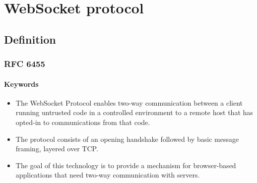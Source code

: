 \documentclass{beamer}
\begin{document}
\section{WebSocket protocol}

\subsection{Definition}
\begin{frame}
    \frametitle{RFC 6455}
    \framesubtitle{Keywords}
    \begin{itemize}[<+->]
        \item The WebSocket Protocol enables \alert<+->{two-way communication} between a
              \alert<+->{client} running untrusted code in a controlled environment to a
              \alert<+->{remote host} that has \alert<+->{opted-in} to communications from
              that code.
        \item The protocol consists of an opening \alert<+->{handshake} followed by basic
              \alert<+->{message framing}, layered over \alert<+->{TCP}.
        \item The goal of this technology is to provide a mechanism for
              \alert<+->{browser-based} applications that need two-way communication with
              servers.
    \end{itemize}
\end{frame}
\end{document}

